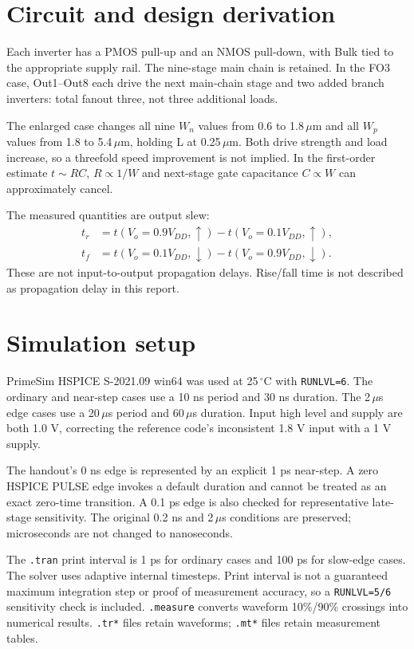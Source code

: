 \section{Circuit and design derivation}
Each inverter has a PMOS pull-up and an NMOS pull-down, with Bulk tied to the appropriate supply rail. The nine-stage main chain is retained. In the FO3 case, Out1--Out8 each drive the next main-chain stage and two added branch inverters: total fanout three, not three additional loads.

The enlarged case changes all nine $W_n$ values from 0.6 to 1.8\,$\mu$m and all $W_p$ values from 1.8 to 5.4\,$\mu$m, holding L at 0.25\,$\mu$m. Both drive strength and load increase, so a threefold speed improvement is not implied. In the first-order estimate $t\sim RC$, $R\propto1/W$ and next-stage gate capacitance $C\propto W$ can approximately cancel.

The measured quantities are output slew:
\[
\begin{aligned}
t_r&=t(V_o=0.9V_{DD},\uparrow)-t(V_o=0.1V_{DD},\uparrow),\\
t_f&=t(V_o=0.1V_{DD},\downarrow)-t(V_o=0.9V_{DD},\downarrow).
\end{aligned}
\]
These are not input-to-output propagation delays. Rise/fall time is not described as propagation delay in this report.

\section{Simulation setup}
PrimeSim HSPICE S-2021.09 win64 was used at 25\,$^\circ$C with \texttt{RUNLVL=6}. The ordinary and near-step cases use a 10 ns period and 30 ns duration. The 2\,$\mu$s edge cases use a 20\,$\mu$s period and 60\,$\mu$s duration. Input high level and supply are both 1.0 V, correcting the reference code's inconsistent 1.8 V input with a 1 V supply.

The handout's 0 ns edge is represented by an explicit 1 ps near-step. A zero HSPICE PULSE edge invokes a default duration and cannot be treated as an exact zero-time transition. A 0.1 ps edge is also checked for representative late-stage sensitivity. The original 0.2 ns and 2\,$\mu$s conditions are preserved; microseconds are not changed to nanoseconds.

The \texttt{.tran} print interval is 1 ps for ordinary cases and 100 ps for slow-edge cases. The solver uses adaptive internal timesteps. Print interval is not a guaranteed maximum integration step or proof of measurement accuracy, so a \texttt{RUNLVL=5/6} sensitivity check is included. \texttt{.measure} converts waveform 10\%/90\% crossings into numerical results. \texttt{.tr*} files retain waveforms; \texttt{.mt*} files retain measurement tables.

